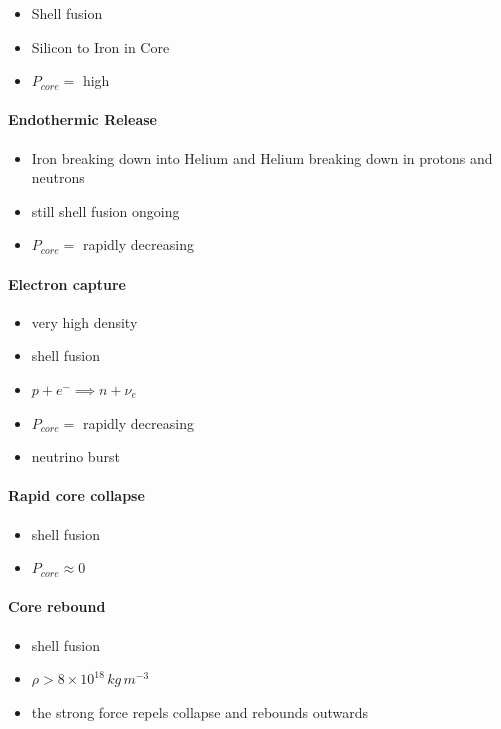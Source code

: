 \documentclass[a4paper,11pt,normalem]{article}
\begin{document}
\begin{itemize}
    \item Shell fusion
    \item Silicon to Iron in Core
    \item \(P_{core} =\) high
\end{itemize}

\paragraph{Endothermic Release}

\begin{itemize}
    \item Iron breaking down into Helium and Helium breaking down in protons and neutrons
    \item still shell fusion ongoing
    \item \(P_{core} =\) rapidly decreasing
\end{itemize}

\paragraph{Electron capture}

\begin{itemize}
    \item very high density
    \item shell fusion
    \item \(p + e^- \implies n + \nu_e\)
    \item \(P_{core} =\) rapidly decreasing
    \item neutrino burst
\end{itemize}

\paragraph{Rapid core collapse}

\begin{itemize}
    \item shell fusion
    \item \(P_{core} \approx 0\)
\end{itemize}

\paragraph{Core rebound}

\begin{itemize}
    \item shell fusion
    \item \(\rho > 8\times10^{18}\,kg\,m^{-3}\)
    \item the strong force repels collapse and rebounds outwards
\end{itemize}
\end{document}
